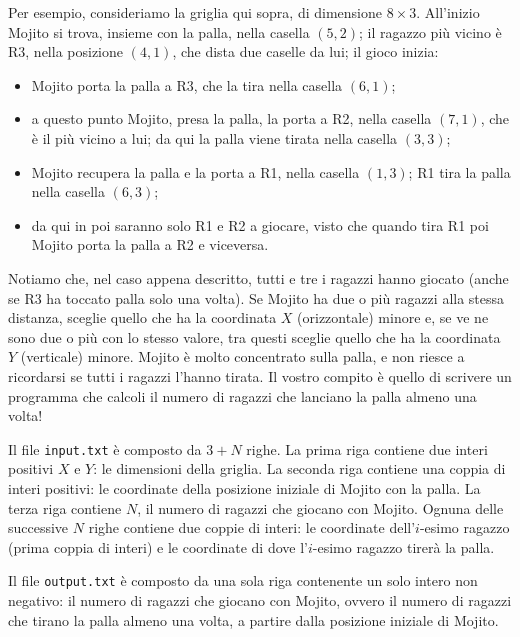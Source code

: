Per esempio, consideriamo la griglia qui sopra, di dimensione $8
\times 3$. All’inizio Mojito si trova, insieme con la palla, nella
casella $(5,2)$; il ragazzo più vicino è R3, nella posizione $(4,1)$,
che dista due caselle da lui; il gioco inizia:

\begin{itemize}[noitemsep]
  \item Mojito porta la palla a R3, che la tira nella casella $(6,1)$;
  \item a questo punto Mojito, presa la palla, la porta a R2, nella
    casella $(7,1)$, che è il più vicino a lui; da qui la palla viene
    tirata nella casella $(3,3)$;
  \item Mojito recupera la palla e la porta a R1, nella casella
    $(1,3)$; R1 tira la palla nella casella $(6,3)$;
  \item da qui in poi saranno solo R1 e R2 a giocare, visto che quando
    tira R1 poi Mojito porta la palla a R2 e viceversa.
\end{itemize}

Notiamo che, nel caso appena descritto, tutti e tre i ragazzi hanno
giocato (anche se R3 ha toccato palla solo una volta). Se Mojito ha
due o più ragazzi alla stessa distanza, sceglie quello che ha la
coordinata $X$ (orizzontale) minore e, se ve ne sono due o più con lo
stesso valore, tra questi sceglie quello che ha la coordinata $Y$
(verticale) minore. Mojito è molto concentrato sulla palla, e non
riesce a ricordarsi se tutti i ragazzi l’hanno tirata. Il vostro
compito è quello di scrivere un programma che calcoli il numero di
ragazzi che lanciano la palla almeno una volta!

Il file \verb'input.txt' è composto da $3+N$ righe. La prima riga
contiene due interi positivi $X$ e $Y$: le dimensioni della
griglia. La seconda riga contiene una coppia di interi positivi: le
coordinate della posizione iniziale di Mojito con la palla. La terza
riga contiene $N$, il numero di ragazzi che giocano con Mojito. Ognuna
delle successive $N$ righe contiene due coppie di interi: le
coordinate dell’$i$-esimo ragazzo (prima coppia di interi) e le
coordinate di dove l’$i$-esimo ragazzo tirerà la palla.

Il file \verb'output.txt' è composto da una sola riga contenente un
solo intero non negativo: il numero di ragazzi che giocano con Mojito,
ovvero il numero di ragazzi che tirano la palla almeno una volta, a
partire dalla posizione iniziale di Mojito.

